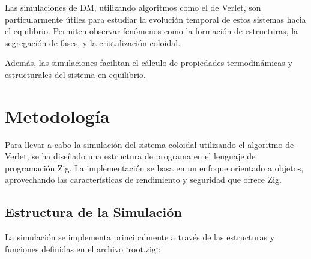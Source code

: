 \documentclass[twocolumn]{article}
\begin{document}
Las simulaciones de DM, utilizando algoritmos como el de Verlet, son particularmente útiles para estudiar la evolución temporal de estos sistemas hacia el equilibrio. Permiten observar fenómenos como la formación de estructuras, la segregación de fases, y la cristalización coloidal.

Además, las simulaciones facilitan el cálculo de propiedades termodinámicas y estructurales del sistema en equilibrio.

\section{Metodología}
Para llevar a cabo la simulación del sistema coloidal utilizando el algoritmo de Verlet, se ha diseñado una estructura de programa en el lenguaje de programación Zig. La implementación\cite{SimulacionColoidalVerlet} se basa en un enfoque orientado a objetos, aprovechando las características de rendimiento y seguridad que ofrece Zig.

\subsection*{Estructura de la Simulación}
La simulación se implementa principalmente a través de las estructuras y funciones definidas en el archivo `root.zig`:
\end{document}
